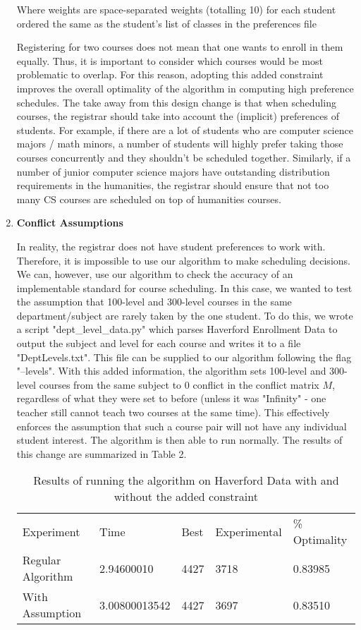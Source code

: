 \documentclass[11pt, oneside]{article}   	%
\begin{document}
\begin{enumerate}
Where weights are space-separated weights (totalling 10) for each student ordered the same as the student's list of classes in the preferences file

Registering for two courses does not mean that one wants to enroll in them equally. Thus, it is important to consider which courses would be most problematic to overlap. For this reason, adopting this added constraint improves the overall optimality of the algorithm in computing high preference schedules. The take away from this design change is that when scheduling courses, the registrar should take into account the (implicit) preferences of students. For example, if there are a lot of students who are computer science majors / math minors, a number of students will highly prefer taking those courses concurrently and they shouldn't be scheduled together. Similarly, if a number of junior computer science majors have outstanding distribution requirements in the humanities, the registrar should ensure that not too many CS courses are scheduled on top of humanities courses.\\

\item{\textbf{Conflict Assumptions}}

In reality, the registrar does not have student preferences to work with. Therefore, it is impossible to use our algorithm to make scheduling decisions. We can, however, use our algorithm to check the accuracy of an implementable standard for course scheduling. In this case, we wanted to test the assumption that 100-level and 300-level courses in the same department/subject are rarely taken by the one student. To do this, we wrote a script "dept\_level\_data.py" which parses Haverford Enrollment Data to output the subject and level for each course and writes it to a file "DeptLevels.txt". This file can be supplied to our algorithm following the flag "--levels". With this added information, the algorithm sets 100-level and 300-level courses from the same subject to $0$ conflict in the conflict matrix $M$, regardless of what they were set to before (unless it was "Infinity" - one teacher still cannot teach two courses at the same time). This effectively enforces the assumption that such a course pair will not have any individual student interest. The algorithm is then able to run normally. The results of this change are summarized in Table 2.\\

\begin{table}[h]
\centering
\begin{tabular}{lllll}
Experiment        & Time          & Best & Experimental & \% Optimality \\
Regular Algorithm & 2.94600010    & 4427 & 3718         & 0.83985       \\
With Assumption   & 3.00800013542 & 4427 & 3697         & 0.83510      
\end{tabular}
\caption{Results of running the algorithm on Haverford Data with and without the added constraint}
\label{my-label}
\end{table}


\end{enumerate}
\end{document}
